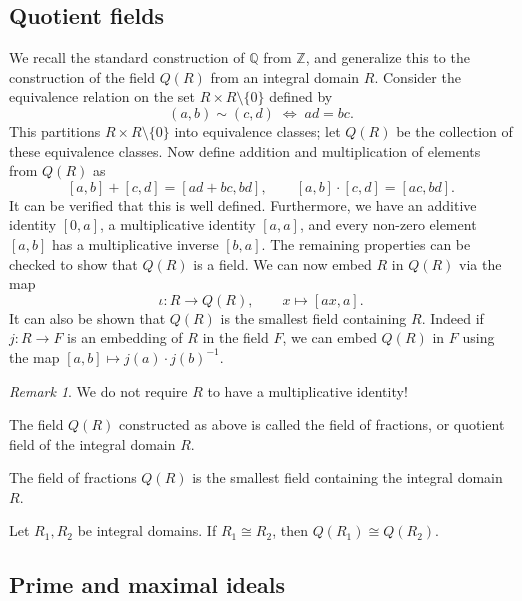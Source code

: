 \documentclass[11pt]{article}
\newcommand{\Q}{\mathbb{Q}}
\newcommand{\Z}{\mathbb{Z}}
\theoremstyle{definition}
\theoremstyle{remark}
\newtheorem*{remark}{Remark}
\numberwithin{equation}{section}
\begin{document}
    \subsection{Quotient fields}

    We recall the standard construction of $\Q$ from $\Z$, and generalize this to the
    construction of the field $Q(R)$ from an integral domain $R$. Consider the
    equivalence relation on the set $R \times R\setminus\{0\}$ defined by \[
        (a, b) \sim (c, d) \;\Longleftrightarrow\; ad = bc.
    \] This partitions $R \times R\setminus\{0\}$ into equivalence classes; let $Q(R)$
    be the collection of these equivalence classes. Now define addition and
    multiplication of elements from $Q(R)$ as \[
        [a, b] + [c, d] = [ad + bc, bd], \qquad [a, b] \cdot [c, d] = [ac, bd].
    \] It can be verified that this is well defined. Furthermore, we have an additive
    identity $[0, a]$, a multiplicative identity $[a, a]$, and every non-zero element
    $[a, b]$ has a multiplicative inverse $[b, a]$. The remaining properties can be
    checked to show that $Q(R)$ is a field. We can now embed $R$ in $Q(R)$ via the
    map \[
        \iota\colon R \to Q(R), \qquad x \mapsto [ax, a].
    \] It can also be shown that $Q(R)$ is the smallest field containing $R$. Indeed
    if $j\colon R \to F$ is an embedding of $R$ in the field $F$, we can embed $Q(R)$
    in $F$ using the map $[a, b] \mapsto j(a)\cdot j(b)^{-1}$.

    \begin{remark}
        We do not require $R$ to have a multiplicative identity!
    \end{remark}

    \begin{definition}
        The field $Q(R)$ constructed as above is called the field of fractions, or
        quotient field of the integral domain $R$.
    \end{definition}

    \begin{lemma}
        The field of fractions $Q(R)$ is the smallest field containing the integral
        domain $R$.
    \end{lemma}

    \begin{lemma}
        Let $R_1, R_2$ be integral domains. If $R_1 \cong R_2$, then $Q(R_1) \cong
        Q(R_2)$.
    \end{lemma}


    \subsection{Prime and maximal ideals}
    
\end{document}
